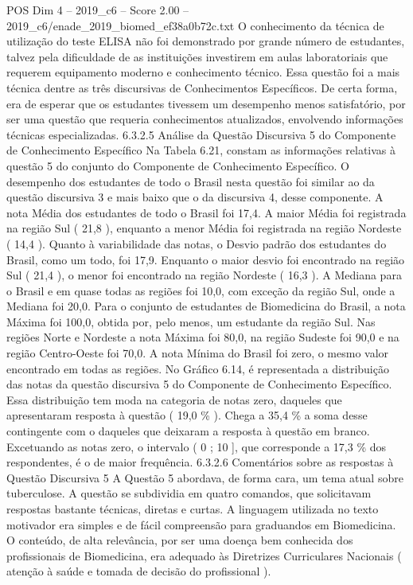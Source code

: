 \begin{textsample}{POS Dim 4 – 2019\_c6 – Score 2.00 – 2019\_c6/enade\_2019\_biomed\_ef38a0b72c.txt}
O conhecimento da técnica de utilização do teste ELISA não foi demonstrado por grande número de estudantes, talvez pela dificuldade de as instituições investirem em aulas laboratoriais que requerem equipamento moderno e conhecimento técnico.
Essa questão foi a mais técnica dentre as três discursivas de Conhecimentos Específicos.
De certa forma, era de esperar que os estudantes tivessem um desempenho menos satisfatório, por ser uma questão que requeria conhecimentos atualizados, envolvendo informações técnicas especializadas. 6.3.2.5 Análise da Questão Discursiva 5 do Componente de Conhecimento Específico Na Tabela 6.21, constam as informações relativas à questão 5 do conjunto do Componente de Conhecimento Específico.
O desempenho dos estudantes de todo o Brasil nesta questão foi similar ao da questão discursiva 3 e mais baixo que o da discursiva 4, desse componente.
A nota Média dos estudantes de todo o Brasil foi 17,4.
A maior Média foi registrada na região Sul ( 21,8 ), enquanto a menor Média foi registrada na região Nordeste ( 14,4 ).
Quanto à variabilidade das notas, o Desvio padrão dos estudantes do Brasil, como um todo, foi 17,9.
Enquanto o maior desvio foi encontrado na região Sul ( 21,4 ), o menor foi encontrado na região Nordeste ( 16,3 ).
A Mediana para o Brasil e em quase todas as regiões foi 10,0, com exceção da região Sul, onde a Mediana foi 20,0.
Para o conjunto de estudantes de Biomedicina do Brasil, a nota Máxima foi 100,0, obtida por, pelo menos, um estudante da região Sul.
Nas regiões Norte e Nordeste a nota Máxima foi 80,0, na região Sudeste foi 90,0 e na região Centro-Oeste foi 70,0.
A nota Mínima do Brasil foi zero, o mesmo valor encontrado em todas as regiões.
No Gráfico 6.14, é representada a distribuição das notas da questão discursiva 5 do Componente de Conhecimento Específico.
Essa distribuição tem moda na categoria de notas zero, daqueles que apresentaram resposta à questão ( 19,0 \% ).
Chega a 35,4 \% a soma desse contingente com o daqueles que deixaram a resposta à questão em branco.
Excetuando as notas zero, o intervalo ( 0 ; 10 ], que corresponde a 17,3 \% dos respondentes, é o de maior frequência. 6.3.2.6 Comentários sobre as respostas à Questão Discursiva 5 A Questão 5 abordava, de forma cara, um tema atual sobre tuberculose.
A questão se subdividia em quatro comandos, que solicitavam respostas bastante técnicas, diretas e curtas.
A linguagem utilizada no texto motivador era simples e de fácil compreensão para graduandos em Biomedicina.
O conteúdo, de alta relevância, por ser uma doença bem conhecida dos profissionais de Biomedicina, era adequado às Diretrizes Curriculares Nacionais ( atenção à saúde e tomada de decisão do profissional ).

\end{textsample}
